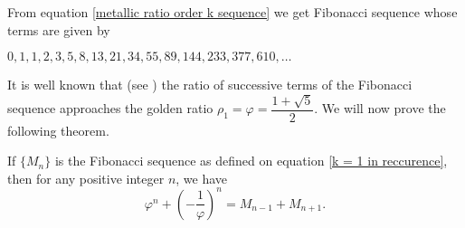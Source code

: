 \documentclass{rmutt-seminar}
\begin{document}
\noindent From equation \eqref{metallic ratio order k sequence} we get Fibonacci sequence whose terms are given by 
\begin{center}
	$0,1,1,2,3,5,8,13,21,34, 55,89,144,233,377,610,\ldots $ 
\end{center}

It is well known that (see \cite{R20}) the ratio of successive terms of the Fibonacci sequence approaches the golden ratio
$ \rho_{1} = \varphi = \dfrac{1+\sqrt{5}}{2}$. We will now prove the following theorem.
\begin{theorem}\label{golden ratio theorem}
If $\bigl\{ M_n \bigr\}$ is the Fibonacci sequence as defined on equation \eqref{k = 1 in reccurence}, then for any positive integer $ n $, we have
\begin{equation}\label{golden ratio recursive}
	\varphi^n + \left(-\frac{1}{\varphi}\right)^n = M_{n-1} + M_{n+1}.  
\end{equation}
\end{theorem}
\end{document}
